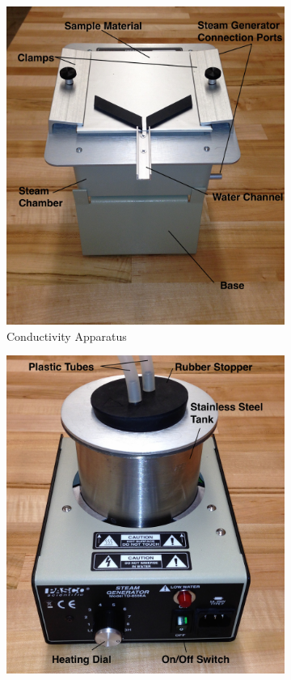 \begin{figure}
	\centering
	\begin{subfigure}{0.48\textwidth}
		\includegraphics[width=\textwidth]{./Exp1-11/pic/condapppic.jpeg}
		\caption{Conductivity Apparatus}
		\label{condexp1}
	\end{subfigure}
\begin{subfigure}{0.48\textwidth}
	\centering
	\includegraphics[width=\textwidth]{./Exp1-11/pic/steamchamberpic.jpeg}

\end{subfigure}
\end{figure}

